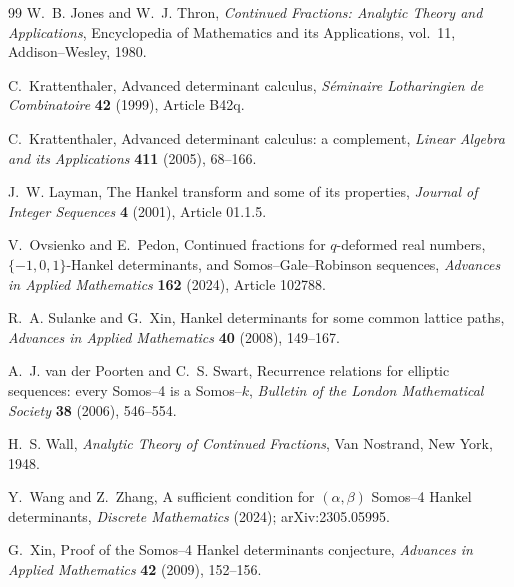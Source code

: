 \documentclass[11pt]{article}
\theoremstyle{remark}
\begin{document}
\begin{thebibliography}{99}
W.~B. Jones and W.~J. Thron,
\newblock \emph{Continued Fractions: Analytic Theory and Applications},
\newblock Encyclopedia of Mathematics and its Applications, vol.~11,
Addison--Wesley, 1980.

C.~Krattenthaler,
\newblock Advanced determinant calculus,
\newblock \emph{S\'eminaire Lotharingien de Combinatoire} \textbf{42} (1999), Article B42q.

C.~Krattenthaler,
\newblock Advanced determinant calculus: a complement,
\newblock \emph{Linear Algebra and its Applications} \textbf{411} (2005), 68--166.

J.~W. Layman,
\newblock The Hankel transform and some of its properties,
\newblock \emph{Journal of Integer Sequences} \textbf{4} (2001), Article 01.1.5.

V.~Ovsienko and E.~Pedon,
\newblock Continued fractions for $q$-deformed real numbers,
$\{-1,0,1\}$-Hankel determinants, and Somos--Gale--Robinson sequences,
\newblock \emph{Advances in Applied Mathematics} \textbf{162} (2024), Article 102788.

R.~A. Sulanke and G.~Xin,
\newblock Hankel determinants for some common lattice paths,
\newblock \emph{Advances in Applied Mathematics} \textbf{40} (2008), 149--167.

A.~J. van der Poorten and C.~S. Swart,
\newblock Recurrence relations for elliptic sequences: every Somos--4 is a Somos--$k$,
\newblock \emph{Bulletin of the London Mathematical Society} \textbf{38} (2006), 546--554.

H.~S. Wall,
\newblock \emph{Analytic Theory of Continued Fractions},
\newblock Van Nostrand, New York, 1948.

Y.~Wang and Z.~Zhang,
\newblock A sufficient condition for $(\alpha,\beta)$ Somos--4 Hankel determinants,
\newblock \emph{Discrete Mathematics} (2024);
\newblock arXiv:2305.05995.

G.~Xin,
\newblock Proof of the Somos--4 Hankel determinants conjecture,
\newblock \emph{Advances in Applied Mathematics} \textbf{42} (2009), 152--156.

\end{thebibliography}
\end{document}
